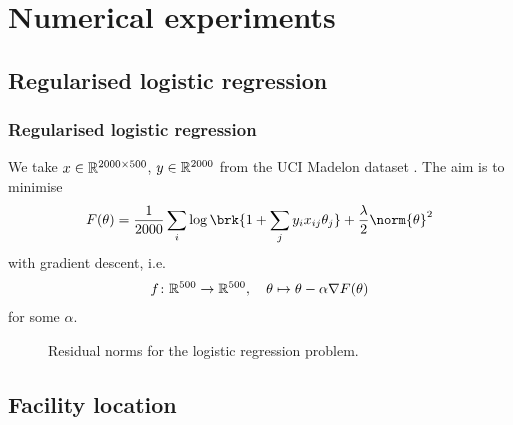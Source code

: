 \begin{frame}
	\centering
	
\end{frame}


\section{Numerical experiments}

\subsection{Regularised logistic regression}

\begin{frame}
	\frametitle{Regularised logistic regression}
	We take $x\in\mathbb{R}^{2000\times 500}$, $y\in\mathbb{R}^{2000}$ from the UCI Madelon dataset \cite{MadDat}. The aim is to minimise
	\begin{align*}
		F(\theta) = \frac{1}{2000}\sum_{i}\log\brk{1+\sum_jy_ix_{ij}\theta_j}+\frac{\lambda}{2}\norm{\theta}^2
	\end{align*}
	with gradient descent, i.e.\
	\begin{align*}
		f\colon \mathbb{R}^{500}\to\mathbb{R}^{500}, \quad \theta\mapsto\theta-\alpha\nabla F(\theta)
	\end{align*}
	for some $\alpha$.
\end{frame}

\begin{frame}
	\begin{figure}
		\centering
		
		\caption{Residual norms for the logistic regression problem.}
	\end{figure}
\end{frame}

\subsection*{Facility location}

